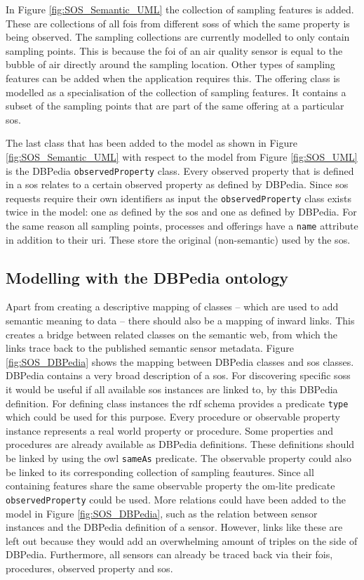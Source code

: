 In Figure \ref{fig:SOS_Semantic_UML} the collection of sampling features is added. These are collections of all \acp{foi} from different \aclp{sos} of which the same property is being observed. The sampling collections are currently modelled to only contain sampling points. This is because the \ac{foi} of an air quality sensor is equal to the bubble of air directly around the sampling location. Other types of sampling features can be added when the application requires this. The offering class is modelled as a specialisation of the collection of sampling features. It contains a subset of the sampling points that are part of the same offering at a particular \ac{sos}.

The last class that has been added to the model as shown in Figure \ref{fig:SOS_Semantic_UML} with respect to the model from Figure \ref{fig:SOS_UML} is the DBPedia \texttt{observedProperty} class. Every observed property that is defined in a \ac{sos} relates to a certain observed property as defined by DBPedia. Since \ac{sos} requests require their own identifiers as input the \texttt{observedProperty} class exists twice in the model: one as defined by the \ac{sos} and one as defined by DBPedia. For the same reason all sampling points, processes and offerings have a \texttt{name} attribute in addition to their \ac{uri}. These store the original (non-semantic) used by the \ac{sos}. 

\subsection{Modelling with the DBPedia ontology}
Apart from creating a descriptive mapping of classes -- which are used to add semantic meaning to data -- there should also be a mapping of inward links. This creates a bridge between related classes on the semantic web, from which the links trace back to the published semantic sensor metadata. Figure \ref{fig:SOS_DBPedia} shows the mapping between DBPedia classes and \ac{sos} classes. DBPedia contains a very broad description of a \ac{sos}. For discovering specific \aclp{sos} it would be useful if all available \ac{sos} instances are linked to, by this DBPedia definition. For defining class instances the \ac{rdf} schema provides a predicate \texttt{type} which could be used for this purpose. Every procedure or observable property instance represents a real world property or procedure. Some properties and procedures are already available as DBPedia definitions. These definitions should be linked by using the \ac{owl} \texttt{sameAs} predicate. The observable property could also be linked to its corresponding collection of sampling feautures. Since all containing features share the same observable property the om-lite predicate \texttt{observedProperty} could be used. More relations could have been added to the model in Figure \ref{fig:SOS_DBPedia}, such as the relation between sensor instances and the DBPedia definition of a sensor. However, links like these are left out because they would add an overwhelming amount of triples on the side of DBPedia. Furthermore, all sensors can already be traced back via their \acp{foi}, procedures, observed property and \ac{sos}. 
 
